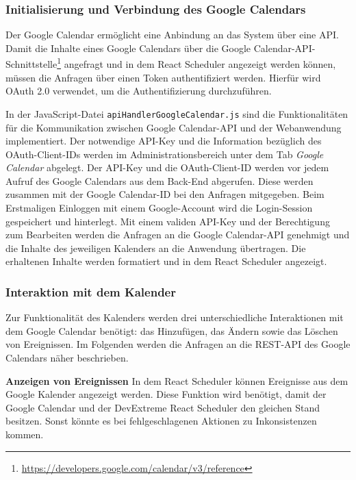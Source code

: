 \subsubsection{Initialisierung und Verbindung des Google Calendars}
Der Google Calendar ermöglicht eine Anbindung an das System über eine \ac{API}.
Damit die Inhalte eines Google Calendars über die Google Calendar-\ac{API}-Schnittstelle\footnote{\url{https://developers.google.com/calendar/v3/reference}} angefragt und in dem React Scheduler angezeigt werden können, müssen die Anfragen über einen Token authentifiziert werden. 
Hierfür wird OAuth 2.0 verwendet, um die Authentifizierung durchzuführen.\autocite[Vgl.][]{GCApi} 

In der JavaScript-Datei \texttt{apiHandlerGoogleCalendar.js} sind die Funktionalitäten für die Kommunikation zwischen Google Calendar-\ac{API} und der Webanwendung implementiert. 
Der notwendige \ac{API}-Key und die Information bezüglich des OAuth-Client-IDs werden im Administrationsbereich unter dem Tab \textit{Google Calendar} abgelegt. 
Der \ac{API}-Key und die OAuth-Client-ID werden vor jedem Aufruf des Google Calendars aus dem Back-End abgerufen. 
Diese werden zusammen mit der Google Calendar-ID bei den Anfragen mitgegeben. 
Beim Erstmaligen Einloggen mit einem Google-Account wird die Login-Session gespeichert und hinterlegt. 
Mit einem validen \ac{API}-Key und der Berechtigung zum Bearbeiten werden die Anfragen an die Google Calendar-\ac{API} genehmigt und die Inhalte des jeweiligen Kalenders an die Anwendung übertragen.
Die erhaltenen Inhalte werden formatiert und in dem React Scheduler angezeigt.

\subsubsection{Interaktion mit dem Kalender}\label{ch:InteraktionGC}
Zur Funktionalität des Kalenders werden drei unterschiedliche Interaktionen mit dem Google Calendar benötigt: das Hinzufügen, das Ändern sowie das Löschen von Ereignissen. Im Folgenden werden die Anfragen an die \ac{REST}-\ac{API} des Google Calendars näher beschrieben.

\textbf{Anzeigen von Ereignissen}\newline
In dem React Scheduler können Ereignisse aus dem Google Kalender angezeigt werden.
Diese Funktion wird benötigt, damit der Google Calendar und der DevExtreme React Scheduler den gleichen Stand besitzen.
Sonst könnte es bei fehlgeschlagenen Aktionen zu Inkonsistenzen kommen.

